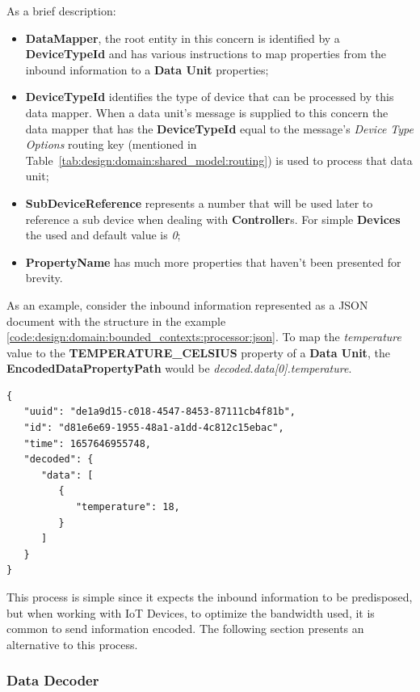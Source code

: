 As a brief description:

\begin{itemize}
   \item \textbf{DataMapper}, the root entity in this concern is identified by a \textbf{DeviceTypeId} and has various instructions to map properties from the inbound information to a \textbf{Data Unit} properties;
   \item \textbf{DeviceTypeId} identifies the type of device that can be processed by this data mapper. When a data unit's message is supplied to this concern the data mapper that has the \textbf{DeviceTypeId} equal to the message's \textit{Device Type Options} routing key (mentioned in Table~\ref{tab:design:domain:shared_model:routing}) is used to process that data unit;
   \item \textbf{SubDeviceReference} represents a number that will be used later to reference a sub device when dealing with \textbf{Controller}s. For simple \textbf{Devices} the used and default value is \textit{0};
   \item \textbf{PropertyName} has much more properties that haven't been presented for brevity.
\end{itemize}

As an example, consider the inbound information represented as a JSON document with the structure in the example \ref{code:design:domain:bounded_contexts:processor:json}. To map the \textit{temperature} value to the \textbf{TEMPERATURE\_CELSIUS} property of a \textbf{Data Unit}, the \textbf{EncodedDataPropertyPath} would be \textit{decoded.data[0].temperature}.

\begin{lstlisting}[caption=Inbound Information Example, label={code:design:domain:bounded_contexts:processor:json}]
{
   "uuid": "de1a9d15-c018-4547-8453-87111cb4f81b",
   "id": "d81e6e69-1955-48a1-a1dd-4c812c15ebac",
   "time": 1657646955748,
   "decoded": {
      "data": [
         {
            "temperature": 18,
         }
      ]
   }
}
\end{lstlisting}

This process is simple since it expects the inbound information to be predisposed, but when working with \gls{IoT} Devices, to optimize the bandwidth used, it is common to send information encoded. The following section presents an alternative to this process.

\subsubsection{Data Decoder}
\label{subsubsec:design:domain:bounded_contexts:decoder}


